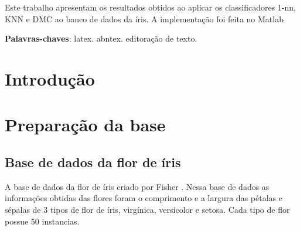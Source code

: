 \documentclass[
	article,			%
	11pt,				%
	oneside,			%
	a4paper,			%
	english,			%
	brazil,				%
	]{abntex2}
\begin{document}
\frenchspacing 


%
%
\maketitle

\begin{resumoumacoluna}
 Este trabalho apresentam os resultados obtidos ao aplicar os classificadores
 1-nn, KNN e DMC ao banco de dados da íris. A implementação foi feita no
 Matlab\texttrademark 
 
 
 \vspace{\onelineskip}
 
 \noindent
 \textbf{Palavras-chaves}: latex. abntex. editoração de texto.
\end{resumoumacoluna}


\textual

\section*{Introdução}


\section{Preparação da base}
\subsection{Base de dados da flor de íris}
A base de dados da flor de íris criado por Fisher \cite{AHG2137}. Nessa base de
dados as informações obtidas das flores foram o comprimento e a largura das
pétalas e sépalas de 3 tipos de flor de íris, virgínica, versicolor e setosa.
Cada tipo de flor possue 50 instancias.
\end{document}
